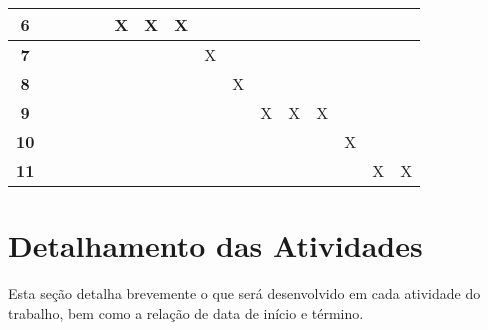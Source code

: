 \begin{table}[H]
\begin{tabular}{c|c|c|c|c|c|c|c|c|c|c|c|c|c|c|c|}
\multicolumn{1}{|c|}{{\bf 6}}         &         &         &               &         & X       & X       & X       &         &         &          &         &         &         &         &         \\ \hline
\multicolumn{1}{|c|}{{\bf 7}}         &         &         &               &         &         &         &         & X       &         &          &         &         &         &         &         \\ \hline
\multicolumn{1}{|c|}{{\bf 8}}         &         &         &               &         &         &         &         &         & X       &          &         &         &         &         &         \\ \hline
\multicolumn{1}{|c|}{{\bf 9}}         &         &         &               &         &         &         &         &         &         & X        & X       & X       &         &         &         \\ \hline
\multicolumn{1}{|c|}{{\bf 10}}        &         &         &               &         &         &         &         &         &         &          &         &         & X       &         &         \\ \hline
\multicolumn{1}{|c|}{{\bf 11}}        &         &         &               &         &         &         &         &         &         &          &         &         &         & X       & X       \\ \hline
\end{tabular}
\end{table}

\section{Detalhamento das Atividades}
Esta seção detalha brevemente o que será desenvolvido em cada atividade do
trabalho, bem como a relação de data de início e término.

